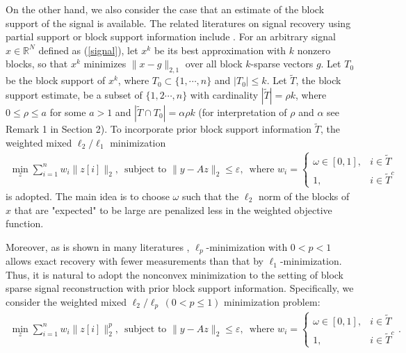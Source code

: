 \documentclass[11pt]{article}
\begin{document}
On the other hand, we also consider the case that an estimate of the block support of the signal is available. The related literatures on signal recovery using partial support or block support information include \cite{fmsy,hwwx,j,kxah,nsw,inw,rw,sac,vl,yb}. For an arbitrary signal $x\in\mathbb{R}^N$ defined as (\ref{signal}), let $x^k$ be its best approximation with $k$ nonzero blocks, so that $x^k$ minimizes $\lVert x-g\rVert_{2,1}$ over all block $k$-sparse vectors $g$. Let $T_0$ be the block support of $x^k$, where $T_0\subset\{1,\cdots,n\}$ and $|T_0|\leq k$. Let $\tilde{T}$, the block support estimate,  be a subset of $\{1,2\cdots,n\}$ with cardinality $|\tilde{T}|=\rho k$, where $0\leq \rho\leq a$ for some $a>1$ and $|\tilde{T}\cap T_0|=\alpha\rho k$ (for interpretation of $\rho$ and $\alpha$ see Remark 1 in Section 2). To incorporate prior block support information $\tilde{T}$, the weighted mixed $\ell_2/\ell_1$ minimization \begin{align}
\min\limits_{z}\sum\limits_{i=1}^n w_i\lVert z[i]\rVert_2,\,\,\,\text{subject to $\lVert y-Az\rVert_2\leq\varepsilon$},\,\,\,
\text{where $w_i=\begin{cases}
	\omega \in[0,1], &\text{$i \in\tilde{T}$}\\
	1, &\text{$i\in\tilde{T}^c$}
	\end{cases}$}
\end{align}
is adopted. The main idea is to choose $\omega$ such that the $\ell_2$ norm of the blocks of $x$ that are "expected" to be large are penalized less in the weighted objective function.

Moreover, as is shown in many literatures \cite{c,fl,xcxz}, $\ell_p$-minimization with $0<p<1$ allows exact recovery with fewer measurements than that by $\ell_1$-minimization. Thus, it is natural to adopt the nonconvex minimization to the setting of block sparse signal reconstruction with prior block support information. Specifically, we consider the weighted mixed $\ell_2/\ell_p\, (0<p\leq 1)$ minimization problem:
\begin{align}
\min\limits_{z}\sum\limits_{i=1}^n w_i\lVert z[i]\rVert_2^p,\,\,\,\text{subject to $\lVert y-Az\rVert_2\leq\varepsilon$},\,\,\,
\text{where $w_i=\begin{cases}
	\omega \in[0,1], &\text{$i \in\tilde{T}$}\\
	1, &\text{$i\in\tilde{T}^c$}
	\end{cases}$}. \label{min}
\end{align}
\end{document}

